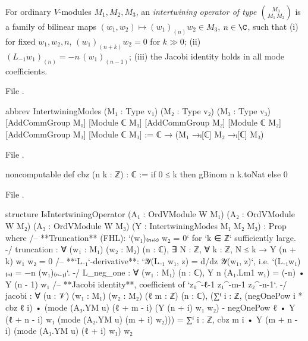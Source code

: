 \begin{definition}\label{l21:def:intw}
For ordinary $V$-modules $M_1,M_2,M_3$, an \emph{intertwining operator of type $\binom{M_3}{M_1\,M_2}$} is a family of
bilinear maps $(w_1,w_2)\mapsto (w_1)_{(n)}w_2\in M_3$, $n\in\C$, such that (i) for fixed $w_1,w_2,n$,
$(w_1)_{(n+k)}w_2=0$ for $k\gg0$; (ii) $(L_{-1}w_1)_{(n)}=-n\,(w_1)_{(n-1)}$; (iii) the Jacobi identity holds in all
mode coefficients.
\end{definition}
\noindent File .
\begin{leancode}
abbrev IntertwiningModes (M₁ : Type v₁) (M₂ : Type v₂) (M₃ : Type v₃)
    [AddCommGroup M₁] [Module ℂ M₁] [AddCommGroup M₂] [Module ℂ M₂]
    [AddCommGroup M₃] [Module ℂ M₃] :=
  ℂ → (M₁ →ₗ[ℂ] M₂ →ₗ[ℂ] M₃)
\end{leancode}
\noindent File .
\begin{leancode}
noncomputable def cbz (n k : ℤ) : ℂ := if 0 ≤ k then gBinom n k.toNat else 0
\end{leancode}
\noindent File .
\begin{leancode}
structure IsIntertwiningOperator (A₁ : OrdVModule W M₁) (A₂ : OrdVModule W M₂)
    (A₃ : OrdVModule W M₃) (Y : IntertwiningModes M₁ M₂ M₃) : Prop where
  /-- **Truncation** (FHL): `(w₁)₍ₙ₊ₖ₎ w₂ = 0` for `k ∈ ℤ` sufficiently large. -/
  truncation : ∀ (w₁ : M₁) (w₂ : M₂) (n : ℂ), ∃ N : ℤ, ∀ k : ℤ, N ≤ k → Y (n + k) w₁ w₂ = 0
  /-- **`L₋₁`-derivative**: `𝒴(L₋₁ w₁, z) = d/dz 𝒴(w₁, z)`, i.e. `(L₋₁w₁)₍ₙ₎ = −n (w₁)₍ₙ₋₁₎`. -/
  L_neg_one : ∀ (w₁ : M₁) (n : ℂ), Y n (A₁.Lm1 w₁) = (-n) • Y (n - 1) w₁
  /-- **Jacobi identity**, coefficient of `z₀^{-ℓ-1} z₁^{-m-1} z₂^{-n-1}`. -/
  jacobi : ∀ (u : 𝒱) (w₁ : M₁) (w₂ : M₂) (ℓ m : ℤ) (n : ℂ),
    (∑ᶠ i : ℤ, (negOnePow i * cbz ℓ i) •
        (mode (A₃.YM u) (ℓ + m - i) (Y (n + i) w₁ w₂)
          - negOnePow ℓ • Y (ℓ + n - i) w₁ (mode (A₂.YM u) (m + i) w₂)))
      = ∑ᶠ i : ℤ, cbz m i • Y (m + n - i) (mode (A₁.YM u) (ℓ + i) w₁) w₂
\end{leancode}

